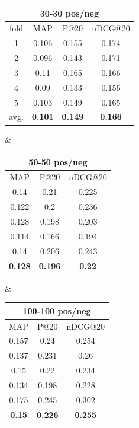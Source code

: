 \begin{adjustbox}{center, tabular=ccc, caption = {DRMM runs (sum normalized histograms), IDF weighting, stemmed with stopwords removal}, nofloat=table}
\centering
\begin{tabular}{c|ccc}
\hline
\multicolumn{4}{c}{30-30 pos/neg} \\ \hline
fold & MAP & P@20 & nDCG@20 \\ \hline
1 & 0.106 & 0.155 & 0.174 \\
2 & 0.096 & 0.143 & 0.171 \\
3 & 0.11 & 0.165 & 0.166 \\
4 & 0.09 & 0.133 & 0.156 \\
5 & 0.103 & 0.149 & 0.165 \\ \hline
avg. & \textbf{0.101} & \textbf{0.149} & \textbf{0.166} \\
\hline
\end{tabular} &
\begin{tabular}{ccc}
\hline
\multicolumn{3}{c}{50-50 pos/neg} \\ \hline
MAP & P@20 & nDCG@20 \\ \hline
0.14 & 0.21 & 0.225 \\
0.122 & 0.2 & 0.236 \\
0.128 & 0.198 & 0.203 \\
0.114 & 0.166 & 0.194 \\
0.14 & 0.206 & 0.243 \\ \hline
\textbf{0.128} & \textbf{0.196} & \textbf{0.22} \\
\hline
\end{tabular} &
\begin{tabular}{ccc}
\hline
\multicolumn{3}{c}{100-100 pos/neg} \\ \hline
MAP & P@20 & nDCG@20 \\ \hline
0.157 & 0.24 & 0.254 \\
0.137 & 0.231 & 0.26 \\
0.15 & 0.22 & 0.234 \\
0.134 & 0.198 & 0.228 \\
0.175 & 0.245 & 0.302 \\ \hline
\textbf{0.15} & \textbf{0.226} & \textbf{0.255} \\
\hline
\end{tabular}
\label{tab:nhsamp}
\end{adjustbox}

